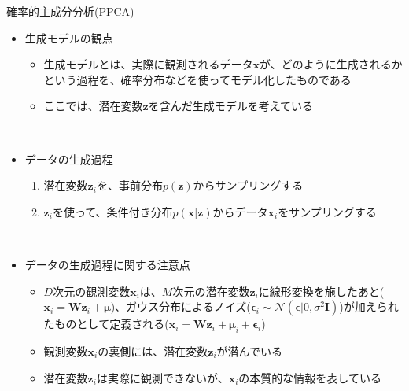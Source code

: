 \documentclass[dvipdfmx,notheorems,t]{beamer}
\begin{document}
\begin{frame}{確率的主成分分析(PPCA)}

\begin{itemize}
	\item 生成モデルの観点
	\begin{itemize}
		\item 生成モデルとは、実際に観測されるデータ$\bm{x}$が、\alert{どのように生成されるか}という過程を、確率分布などを使ってモデル化したものである
		\item ここでは、潜在変数$\bm{z}$を含んだ生成モデルを考えている
	\end{itemize} \
	
	\item データの生成過程
	\begin{enumerate}
		\item 潜在変数$\bm{z}_i$を、事前分布$p(\bm{z})$からサンプリングする
		\item $\bm{z}_i$を使って、条件付き分布$p(\bm{x} | \bm{z})$からデータ$\bm{x}_i$をサンプリングする
	\end{enumerate} \
	
	\item データの生成過程に関する注意点
	\begin{itemize}
		\item $D$次元の観測変数$\bm{x}_i$は、$M$次元の潜在変数$\bm{z}_i$に\alert{線形変換}を施したあと($\bm{x}_i = \bm{W} \bm{z}_i + \bm{\mu}$)、ガウス分布による\alert{ノイズ}($\bm{\epsilon}_i \sim \mathcal{N}(\bm{\epsilon} | 0, \sigma^2 \bm{I})$)が加えられたものとして定義される($\bm{x}_i = \bm{W} \bm{z}_i + \bm{\mu}_i + \bm{\epsilon}_i$)
		\newline
		
		\item 観測変数$\bm{x}_i$の裏側には、潜在変数$\bm{z}_i$が潜んでいる
		\item 潜在変数$\bm{z}_i$は実際に観測できないが、$\bm{x}_i$の本質的な情報を表している
	\end{itemize}
\end{itemize}

\end{frame}
\end{document}
